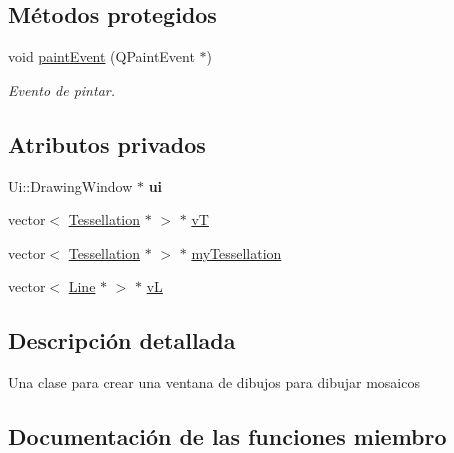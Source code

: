 \subsection*{Métodos protegidos}
\begin{DoxyCompactItemize}
\item 
\hypertarget{class_drawing_window_aceb9c5cc4f2ef40d99aca7d3fbd4e91a}{}void \hyperlink{class_drawing_window_aceb9c5cc4f2ef40d99aca7d3fbd4e91a}{paint\+Event} (Q\+Paint\+Event $\ast$)\label{class_drawing_window_aceb9c5cc4f2ef40d99aca7d3fbd4e91a}

\begin{DoxyCompactList}\small\item\em Evento de pintar. \end{DoxyCompactList}\end{DoxyCompactItemize}
\subsection*{Atributos privados}
\begin{DoxyCompactItemize}
\item 
\hypertarget{class_drawing_window_ad58ced401c1eaf6cfaf67a0f8f94ce18}{}Ui\+::\+Drawing\+Window $\ast$ {\bfseries ui}\label{class_drawing_window_ad58ced401c1eaf6cfaf67a0f8f94ce18}

\item 
vector$<$ \hyperlink{class_tessellation}{Tessellation} $\ast$ $>$ $\ast$ \hyperlink{class_drawing_window_a00c917f0910ac7b70729d6a48f0602ac}{v\+T}
\item 
vector$<$ \hyperlink{class_tessellation}{Tessellation} $\ast$ $>$ $\ast$ \hyperlink{class_drawing_window_a82bd46efc8a35b62fcd207c42aa49ade}{my\+Tessellation}
\item 
vector$<$ \hyperlink{class_line}{Line} $\ast$ $>$ $\ast$ \hyperlink{class_drawing_window_a6e1effc34bb2f2c43becfd1df203b693}{v\+L}
\end{DoxyCompactItemize}


\subsection{Descripción detallada}
Una clase para crear una ventana de dibujos para dibujar mosaicos 

\subsection{Documentación de las funciones miembro}
\hypertarget{class_drawing_window_a3097e096223530c9f93737441d77422f}{}
